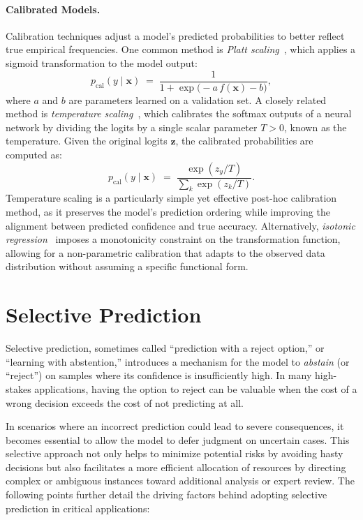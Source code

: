 \paragraph{Calibrated Models.}
Calibration techniques adjust a model’s predicted probabilities to better reflect true empirical frequencies. One common method is \emph{Platt scaling}~\citep{platt1999probabilistic}, which applies a sigmoid transformation to the model output:
\begin{equation}
p_{\text{cal}}(y \mid \bm{x}) \;=\; \frac{1}{1 + \exp\bigl(-a \, f(\bm{x}) - b\bigr)},
\end{equation}
where $a$ and $b$ are parameters learned on a validation set. A closely related method is \emph{temperature scaling}~\citep{guo2017calibration}, which calibrates the softmax outputs of a neural network by dividing the logits by a single scalar parameter $T > 0$, known as the temperature. Given the original logits $\bm{z}$, the calibrated probabilities are computed as:
\begin{equation}
p_{\text{cal}}(y \mid \bm{x}) \;=\; \frac{\exp(z_y / T)}{\sum_{k} \exp(z_k / T)}.
\end{equation}
Temperature scaling is a particularly simple yet effective post-hoc calibration method, as it preserves the model’s prediction ordering while improving the alignment between predicted confidence and true accuracy. Alternatively, \emph{isotonic regression}~\citep{zadrozny2002transforming} imposes a monotonicity constraint on the transformation function, allowing for a non-parametric calibration that adapts to the observed data distribution without assuming a specific functional form.

\section{Selective Prediction}
Selective prediction, sometimes called ``prediction with a reject option,'' or ``learning with abstention,'' introduces a mechanism for the model to \emph{abstain} (or ``reject'') on samples where its confidence is insufficiently high. In many high-stakes applications, having the option to reject can be valuable when the cost of a wrong decision exceeds the cost of not predicting at all.

In scenarios where an incorrect prediction could lead to severe consequences, it becomes essential to allow the model to defer judgment on uncertain cases. This selective approach not only helps to minimize potential risks by avoiding hasty decisions but also facilitates a more efficient allocation of resources by directing complex or ambiguous instances toward additional analysis or expert review. The following points further detail the driving factors behind adopting selective prediction in critical applications:


